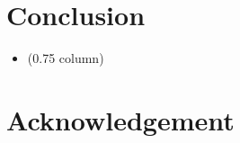 \documentclass[journal]{IEEEtran}
\begin{document}
\section{Conclusion}
\begin{itemize}
\item (0.75 column)
\end{itemize}

% 

% 

\section*{Acknowledgement}






\end{document}
